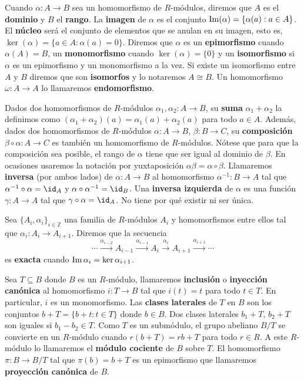 Cuando $\alpha: A \rightarrow B$ sea un homomorfismo de $R$-módulos, diremos que $A$ es el \textbf{dominio} y $B$ el \textbf{rango}. La \textbf{imagen} de $\alpha$ es el conjunto $\operatorname{Im}(\alpha) = \{ \alpha(a) : a \in A \}$. El \textbf{núcleo} será el conjunto de elementos que se anulan en su imagen, esto es, $\ker(\alpha) = \{ a \in A : \alpha(a) = 0 \}$. Diremos que $\alpha$ es un \textbf{epimorfismo} cuando $\alpha(A) = B$, un \textbf{monomorfismo} cuando $\ker(\alpha) = \{0\}$ y un \textbf{isomorfismo} si $\alpha$ es un epimorfismo y un monomorfismo a la vez. Si existe un isomorfismo entre $A$ y $B$ diremos que son \textbf{isomorfos} y lo notaremos $A \cong B$. Un homomorfismo $\omega: A \rightarrow A$ lo llamaremos \textbf{endomorfismo}.

Dados dos homomorfismos de $R$-módulos $\alpha_1, \alpha_2 : A \rightarrow B$, su \textbf{suma} $\alpha_1 + \alpha_2$ la definimos como $(\alpha_1 + \alpha_2)(a) = \alpha_1(a) + \alpha_2(a)$ para todo $a \in A$. Además, dados dos homomorfismos de $R$-módulos $\alpha: A \rightarrow B$, $\beta: B \rightarrow C$, su \textbf{composición} $\beta \circ \alpha: A \rightarrow C$ es también un homomorfismo de $R$-módulos. Nótese que para que la composición sea posible, el rango de $\alpha$ tiene que ser igual al dominio de $\beta$. En ocasiones usaremos la notación por yuxtaposición $\alpha\beta = \alpha \circ \beta$. Llamaremos \textbf{inversa} (por ambos lados) de $\alpha : A \rightarrow B$ al homomorfismo $\alpha^{-1} : B \rightarrow A$ tal que $\alpha^{-1} \circ \alpha = \id_A$ y $\alpha \circ \alpha^{-1} = \id_B$. Una \textbf{inversa izquierda} de $\alpha$ es una función $\gamma: A \rightarrow A$ tal que $\gamma \circ \alpha = \id_A$. No tiene por qué existir ni ser única.

\begin{definicion}
	Sea $\{A_i, \alpha_i\}_{i \in \mathbb{Z}}$ una familia de $R$-módulos $A_i$ y homomorfismos entre ellos tal que $\alpha_i: A_i \rightarrow A_{i+1}$. Diremos que la secuencia
	\[ \cdots \xrightarrow{\alpha_{i-2}} A_{i-1} \xrightarrow{\alpha_{i-1}} A_i \xrightarrow{\alpha_{i}} A_{i+1} \xrightarrow{\alpha_{i+1}} \cdots \]
	es \textbf{exacta} cuando $\operatorname{Im} \alpha_i = \ker \alpha_{i+1}$.
\end{definicion}

Sea \(T \subseteq B\) donde $B$ es un $R$-módulo, llamaremos \textbf{inclusión} o \textbf{inyección canónica} al homomorfismo $i: T \rightarrow B$ tal que $i(t) = t$ para todo $t \in T$. En particular, $i$ es un monomorfismo. Las \textbf{clases laterales} de $T$ en $B$ son los conjuntos $b + T = \{b + t : t \in T\}$ donde $b \in B$. Dos clases laterales $b_1 + T$, $b_2 + T$ son iguales si $b_1 - b_2 \in T$. Como $T$ es un submódulo, el grupo abeliano $B/T$ se convierte en un $R$-módulo cuando $r(b+T) = rb + T$ para todo $r \in R$. A este $R$-módulo lo llamaremos el \textbf{módulo cociente} de $B$ sobre $T$. El homomorfismo $\pi: B \rightarrow B/T$ tal que $\pi(b) = b + T$ es un epimorfismo que llamaremos \textbf{proyección canónica} de $B$.

